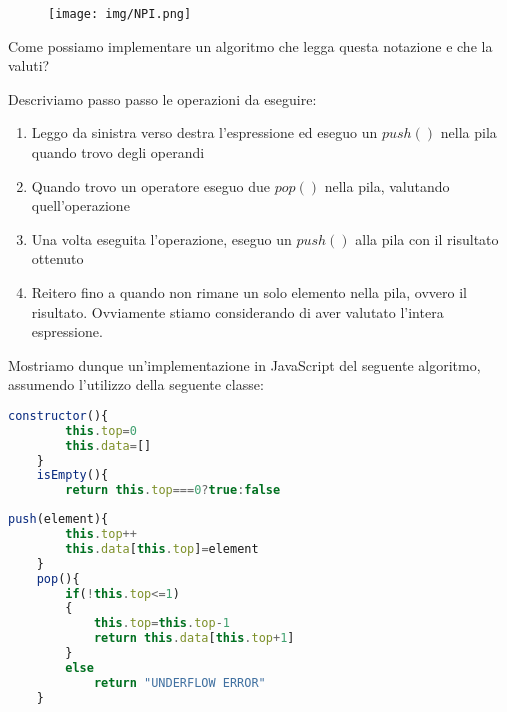 \documentclass{article}
\begin{document}
\begin{figure}[htbp]
    \center
    \texttt{[image: img/NPI.png]}
\end{figure}

Come possiamo implementare un algoritmo che legga questa notazione e che la valuti?

Descriviamo passo passo le operazioni da eseguire:

\begin{enumerate}
    \item Leggo da sinistra verso destra l'espressione ed eseguo un $push()$ nella pila quando trovo degli operandi
    \item Quando trovo un operatore eseguo due $pop()$ nella pila, valutando quell'operazione
    \item Una volta eseguita l'operazione, eseguo un $push()$ alla pila con il risultato ottenuto
    \item Reitero fino a quando non rimane un solo elemento nella pila, ovvero il risultato. Ovviamente stiamo considerando di aver valutato l'intera espressione.
\end{enumerate}

Mostriamo dunque un'implementazione in JavaScript del seguente algoritmo, assumendo l'utilizzo della seguente classe:

\begin{lstlisting}[language=JavaScript]
    constructor(){
        this.top=0
        this.data=[]
    }
    isEmpty(){
        return this.top===0?true:false
\end{lstlisting}

\begin{lstlisting}[language=JavaScript]
    push(element){
        this.top++
        this.data[this.top]=element
    }
    pop(){
        if(!this.top<=1)
        {
            this.top=this.top-1
            return this.data[this.top+1]
        }
        else
            return "UNDERFLOW ERROR"
    }
\end{lstlisting}

\newpage
\end{document}
